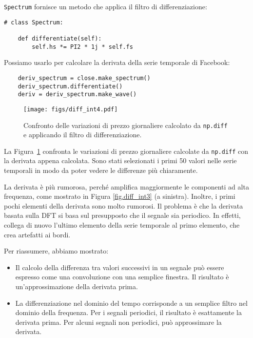 \documentclass[12pt,a4paper]{book}
\begin{document}
{\tt Spectrum} fornisce un metodo che applica il filtro di differenziazione:

\begin{verbatim} 
# class Spectrum:

    def differentiate(self):
        self.hs *= PI2 * 1j * self.fs
 \end{verbatim} 

Possiamo usarlo per calcolare la derivata della serie temporale di Facebook:

\begin{verbatim} 
    deriv_spectrum = close.make_spectrum()
    deriv_spectrum.differentiate()
    deriv = deriv_spectrum.make_wave()
 \end{verbatim} 

\begin{figure} 

\centerline{\texttt{[image: figs/diff\_int4.pdf]}} \caption{Confronto delle variazioni di prezzo giornaliere calcolato da {\tt np.diff} e applicando il filtro di differenziazione.} \label{fig.diff_int4} \end{figure} 

La Figura~\ref{fig.diff_int4} confronta le variazioni di prezzo giornaliere calcolate da {\tt np.diff} con la derivata appena calcolata. Sono stati selezionati i primi 50 valori nelle serie temporali in modo da poter vedere le differenze più chiaramente.

La derivata è più rumorosa, perché amplifica maggiormente le componenti ad alta frequenza, come mostrato in Figura \ref{fig.diff_int3} (a sinistra). Inoltre, i primi pochi elementi della derivata sono molto rumorosi. Il problema è che la derivata basata sulla DFT si basa sul presupposto che il segnale sia periodico. In effetti, collega di nuovo l'ultimo elemento della serie temporale al primo elemento, che crea artefatti ai bordi.

Per riassumere, abbiamo mostrato:

\begin{itemize} 

\item Il calcolo della differenza tra valori successivi in un segnale può essere espresso come una convoluzione con una semplice finestra. Il risultato è un'approssimazione della derivata prima.

\item La differenziazione nel dominio del tempo corrisponde a un semplice filtro nel dominio della frequenza. Per i segnali periodici, il risultato è esattamente la derivata prima. Per alcuni segnali non periodici, può approssimare la derivata.

\end{itemize} 
\end{document}
